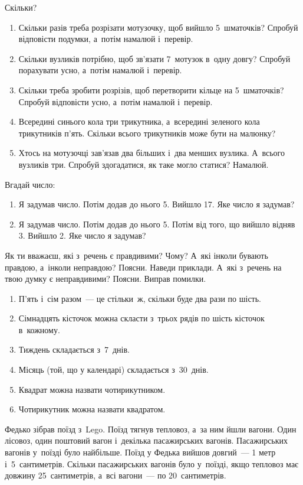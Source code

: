 \problem
Скільки?
\begin{enumerate}
    \item Скільки разів треба розрізати мотузочку, щоб вийшло 5~шматочків?
    Спробуй відповісти подумки, а~потім намалюй і~перевір.
    \item Скільки вузликів потрібно, щоб зв'язати 7~мотузок в~одну довгу?
    Спробуй порахувати усно, а~потім намалюй і~перевір.
    \item Скільки треба зробити розрізів, щоб перетворити кільце
    на 5~шматочків? Спробуй відповісти усно, а~потім намалюй і~перевір.
    \item Всередині синього кола три трикутника, а~всередині зеленого кола
    трикутників п'ять. Скільки всього трикутників може бути на малюнку?
    \item Хтось на мотузочці зав'язав два більших і~два менших вузлика.
    А~всього вузликів три. Спробуй здогадатися, як таке могло статися? Намалюй.
\end{enumerate}


\problem
Вгадай число:
\begin{enumerate}
    \item Я задумав число. Потім додав до нього 5. Вийшло 17.
    Яке число я задумав?
    \item Я задумав число. Потім додав до нього 5.
    Потім від того, що вийшло відняв 3. Вийшло 2.
    Яке число я задумав?
\end{enumerate}


\problem
Як ти вважаєш, які з~речень є правдивими? Чому?
А~які інколи бувають правдою, а~інколи неправдою? Поясни. Наведи приклади.
А~які з~речень на твою думку є неправдивими? Поясни. Виправ помилки.
\begin{enumerate}
    \item П'ять і~сім разом~--- це стільки~ж, скільки буде два рази по шість.
    \item Сімнадцять кісточок можна скласти з~трьох рядів
    по шість кісточок в~кожному.
    \item Тиждень складається з~7~днів.
    \item Місяць (той, що у календарі) складається з~30~днів.
    \item Квадрат можна назвати чотирикутником.
    \item Чотирикутник можна назвати квадратом.
\end{enumerate}


\problem
Федько зібрав поїзд з~Lego. Поїзд тягнув тепловоз, а~за ним йшли вагони.
Один лісовоз, один поштовий вагон і~декілька пасажирських вагонів.
Пасажирських вагонів у~поїзді було найбільше.
Поїзд у Федька вийшов довгий~--- 1 метр і~5~сантиметрів.
Скільки пасажирських вагонів було у~поїзді,
якщо тепловоз має довжину 25~сантиметрів, а~всі вагони~--- по 20~сантиметрів.


